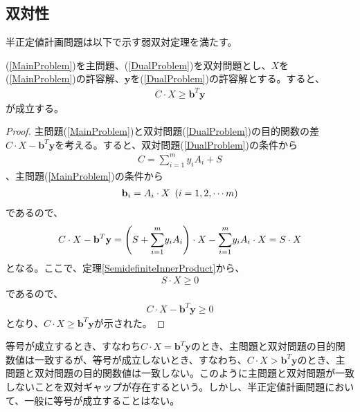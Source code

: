 \subsection{双対性}
半正定値計画問題は以下で示す弱双対定理を満たす。
\begin{theorem}
  (\ref{MainProblem})を主問題、(\ref{DualProblem})を双対問題とし、$X$を(\ref{MainProblem})の許容解、$\mathbf{y}$を(\ref{DualProblem})の許容解とする。すると、
  \begin{align*}
    C \cdot X \geq \mathbf{b}^T \mathbf{y}
  \end{align*}
  が成立する。
\end{theorem}
\begin{proof}
  主問題(\ref{MainProblem})と双対問題(\ref{DualProblem})の目的関数の差$C \cdot X - \mathbf{b}^T \mathbf{y}$を考える。すると、双対問題(\ref{DualProblem})の条件から
  \begin{align*}
    C = \displaystyle{\sum_{i = 1}^m} y_i A_i + S
  \end{align*}
  、主問題(\ref{MainProblem})の条件から
  \begin{align*}
    \mathbf{b}_i = A_i \cdot X \,\, \parenthesis(i = 1, 2, \cdots m)
  \end{align*}
  であるので、
  \begin{align*}
    C \cdot X - \mathbf{b}^T \mathbf{y} = \parenthesis(S + \displaystyle{\sum_{i = 1}^m} y_i A_i) \cdot X - \displaystyle{\sum_{i = 1}^m} y_i A_i \cdot X = S \cdot X
  \end{align*}
  となる。ここで、定理\ref{SemidefiniteInnerProduct}から、
  \begin{align*}
    S \cdot X \geq 0
  \end{align*}
  であるので、
  \begin{align*}
    C \cdot X - \mathbf{b}^T \mathbf{y} \geq 0
  \end{align*}
  となり、$C \cdot X \geq \mathbf{b}^T \mathbf{y}$が示された。
\end{proof}
等号が成立するとき、すなわち$C \cdot X = \mathbf{b}^T \mathbf{y}$のとき、主問題と双対問題の目的関数値は一致するが、等号が成立しないとき、すなわち、$C \cdot X > \mathbf{b}^T \mathbf{y}$のとき、主問題と双対問題の目的関数値は一致しない。このように主問題と双対問題が一致しないことを双対ギャップが存在するという。しかし、半正定値計画問題において、一般に等号が成立することはない\cite{SemidefiniteDuality}。
